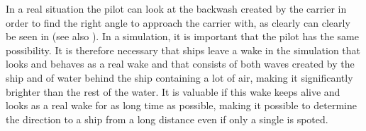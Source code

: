 In a real situation the pilot can look at the backwash created by the carrier in order to find the right angle to approach the carrier with, as clearly can clearly be seen in \citep{Alivewithpassion2007,MatteoBram2007} (see also ). In a simulation, it is important that the pilot has the same possibility. It is therefore necessary that ships leave a wake in the simulation that looks and behaves as a real wake and that consists of both waves created by the ship and of water behind the ship containing a lot of air, making it significantly brighter than the rest of the water. It is valuable if this wake keeps alive and looks as a real wake for as long time as possible, making it possible to determine the direction to a ship from a long distance even if only a single  is spoted.